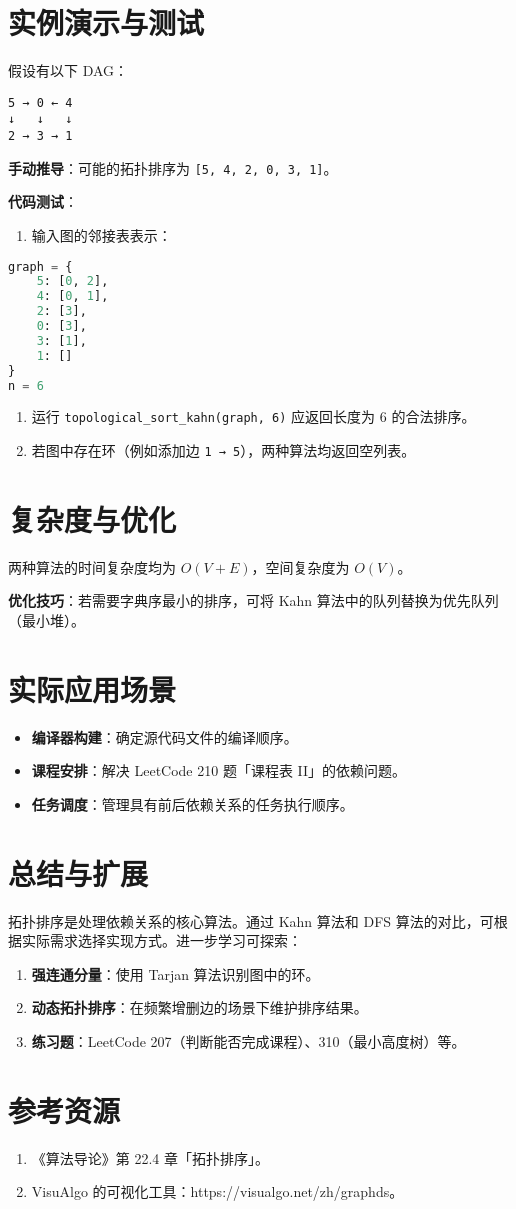 \chapter{实例演示与测试}
假设有以下 DAG：\par
\begin{lstlisting}
5 → 0 ← 4  
↓   ↓   ↓  
2 → 3 → 1  
\end{lstlisting}
\textbf{手动推导}：可能的拓扑排序为 \verb![5, 4, 2, 0, 3, 1]!。\par\textbf{代码测试}：\par
\begin{enumerate}
\item 输入图的邻接表表示：
\end{enumerate}
\begin{lstlisting}[language=python]
graph = {
    5: [0, 2],
    4: [0, 1],
    2: [3],
    0: [3],
    3: [1],
    1: []
}
n = 6  
\end{lstlisting}
\begin{enumerate}
\item 运行 \verb!topological_sort_kahn(graph, 6)! 应返回长度为 6 的合法排序。
\item 若图中存在环（例如添加边 \verb!1 → 5!），两种算法均返回空列表。
\end{enumerate}
\chapter{复杂度与优化}
两种算法的时间复杂度均为 $O(V + E)$，空间复杂度为 $O(V)$。\par\textbf{优化技巧}：若需要字典序最小的排序，可将 Kahn 算法中的队列替换为优先队列（最小堆）。\par
\chapter{实际应用场景}
\begin{itemize}
\item \textbf{编译器构建}：确定源代码文件的编译顺序。
\item \textbf{课程安排}：解决 LeetCode 210 题「课程表 II」的依赖问题。
\item \textbf{任务调度}：管理具有前后依赖关系的任务执行顺序。
\end{itemize}
\chapter{总结与扩展}
拓扑排序是处理依赖关系的核心算法。通过 Kahn 算法和 DFS 算法的对比，可根据实际需求选择实现方式。进一步学习可探索：\par
\begin{enumerate}
\item \textbf{强连通分量}：使用 Tarjan 算法识别图中的环。
\item \textbf{动态拓扑排序}：在频繁增删边的场景下维护排序结果。
\item \textbf{练习题}：LeetCode 207（判断能否完成课程）、310（最小高度树）等。
\end{enumerate}
\chapter{参考资源}
\begin{enumerate}
\item 《算法导论》第 22.4 章「拓扑排序」。
\item VisuAlgo 的可视化工具：https://visualgo.net/zh/graphds。
\end{enumerate}
